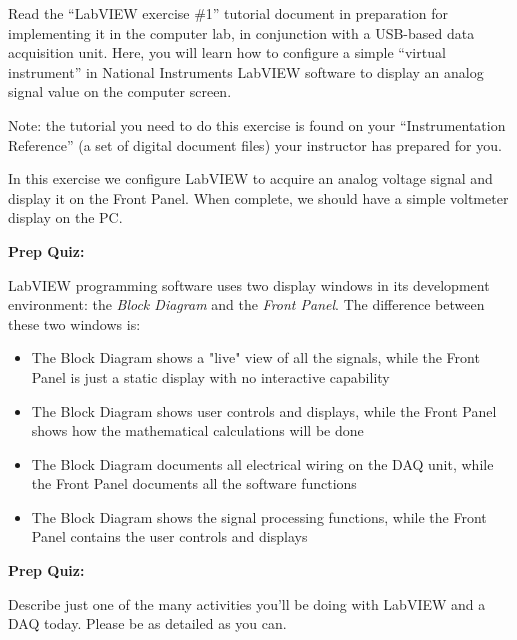 

Read the ``LabVIEW exercise \#1'' tutorial document in preparation for implementing it in the computer lab, in conjunction with a USB-based data acquisition unit.  Here, you will learn how to configure a simple ``virtual instrument'' in National Instruments LabVIEW software to display an analog signal value on the computer screen.

\vskip 10pt

Note: the tutorial you need to do this exercise is found on your ``Instrumentation Reference'' (a set of digital document files) your instructor has prepared for you.














In this exercise we configure LabVIEW to acquire an analog voltage signal and display it on the Front Panel.  When complete, we should have a simple voltmeter display on the PC. 










\vfil \eject

\noindent
{\bf Prep Quiz:}

LabVIEW programming software uses two display windows in its development environment: the {\it Block Diagram} and the {\it Front Panel}.  The difference between these two windows is:

\begin{itemize}
\item{} The Block Diagram shows a "live" view of all the signals, while the Front Panel is just a static display with no interactive capability
\vskip 10pt
\item{} The Block Diagram shows user controls and displays, while the Front Panel shows how the mathematical calculations will be done
\vskip 10pt
\item{} The Block Diagram documents all electrical wiring on the DAQ unit, while the Front Panel documents all the software functions
\vskip 10pt
\item{} The Block Diagram shows the signal processing functions, while the Front Panel contains the user controls and displays
\end{itemize}












\vfil \eject

\noindent
{\bf Prep Quiz:}

Describe just one of the many activities you'll be doing with LabVIEW and a DAQ today.  Please be as detailed as you can.



